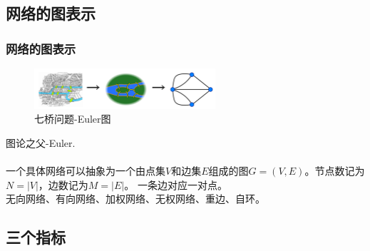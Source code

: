 \subsection*{网络的图表示}

	\begin{frame}
		\frametitle{网络的图表示}
			
		\begin{figure}[htbp]
			\centering
			\includegraphics[width=0.6\textwidth, bb = 0 0 1116 249]{pic/01-sevenb.png}
			\caption{七桥问题-Euler图}
		\end{figure}

		图论之父-Euler. \\
		
		~\\
		一个具体网络可以抽象为一个由点集$V$和边集$E$组成的图$G=(V,E)$。节点数记为$N=|V|$，边数记为$M=|E|$。 一条边对应一对点。\\
		无向网络、有向网络、加权网络、无权网络、重边、自环。
	
	\end{frame}


\subsection*{三个指标}

